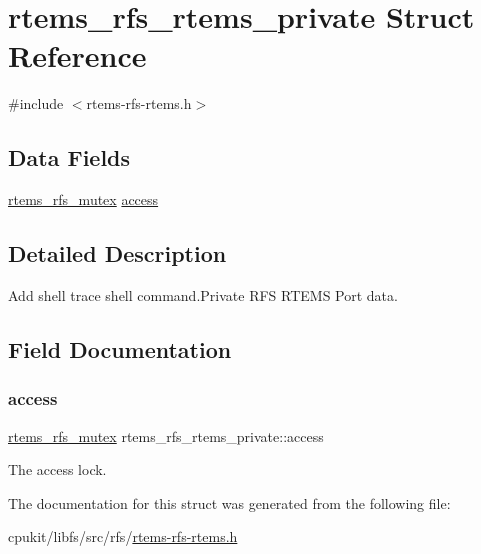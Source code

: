 \hypertarget{structrtems__rfs__rtems__private}{}\section{rtems\+\_\+rfs\+\_\+rtems\+\_\+private Struct Reference}
\label{structrtems__rfs__rtems__private}


{\ttfamily \#include $<$rtems-\/rfs-\/rtems.\+h$>$}

\subsection*{Data Fields}
\begin{DoxyCompactItemize}
\item 
\mbox{\hyperlink{rtems-rfs-mutex_8h_a5234b0b9f6a152769b4f405b76461a19}{rtems\+\_\+rfs\+\_\+mutex}} \mbox{\hyperlink{structrtems__rfs__rtems__private_a37163a0db01440831a256048985dc67b}{access}}
\end{DoxyCompactItemize}


\subsection{Detailed Description}
Add shell trace shell command.\+Private R\+FS R\+T\+E\+MS Port data. 

\subsection{Field Documentation}
\mbox{\label{structrtems__rfs__rtems__private_a37163a0db01440831a256048985dc67b}} 
\subsubsection{\texorpdfstring{access}{access}}
{\footnotesize\ttfamily \mbox{\hyperlink{rtems-rfs-mutex_8h_a5234b0b9f6a152769b4f405b76461a19}{rtems\+\_\+rfs\+\_\+mutex}} rtems\+\_\+rfs\+\_\+rtems\+\_\+private\+::access}

The access lock. 

The documentation for this struct was generated from the following file\+:\begin{DoxyCompactItemize}
\item 
cpukit/libfs/src/rfs/\mbox{\hyperlink{rtems-rfs-rtems_8h}{rtems-\/rfs-\/rtems.\+h}}\end{DoxyCompactItemize}
